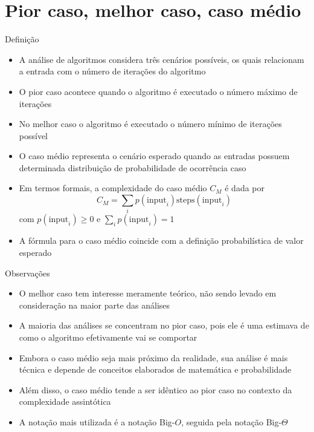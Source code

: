 \section{Pior caso, melhor caso, caso médio}

\begin{frame}[fragile]{Definição}

	\begin{itemize}
        \item A análise de algoritmos considera três cenários possíveis, os quais relacionam
        a entrada com o número de iterações do algoritmo

		\item O pior caso acontece quando o algoritmo é executado o número máximo de iterações

		\item No melhor caso o algoritmo é executado o número mínimo de iterações possível

		\item O caso médio representa o cenário esperado quando as entradas possuem determinada
        distribuição de probabilidade de ocorrência
		caso

		\item Em termos formais, a complexidade do caso médio $C_M$ é dada por
		\[
		C_M = \sum_i p(\mbox{input}_i)\mbox{steps}(\mbox{input}_i)
		\] 
        com $p(\mbox{input}_i) \geq 0$ e $\sum_i p(\mbox{input}_i) = 1$

		\item A fórmula para o caso médio coincide com a definição probabilística de
		valor esperado

	\end{itemize}

\end{frame}

\begin{frame}[fragile]{Observações}

    \begin{itemize}
        \item O melhor caso tem interesse meramente teórico, não sendo levado em
        consideração na maior parte das análises

        \item A maioria das análises se concentram no pior caso, pois ele é uma estimava
        de como o algoritmo efetivamente vai se comportar
    
        \item Embora o caso médio seja mais próximo da realidade, sua análise é mais técnica
        e depende de conceitos elaborados de matemática e probabilidade

        \item Além disso, o caso médio tende a ser idêntico ao pior caso no contexto da
        complexidade assintótica

        \item A notação mais utilizada é a notação Big-$O$, seguida pela notação
        Big-$\Theta$
    \end{itemize}

\end{frame}
